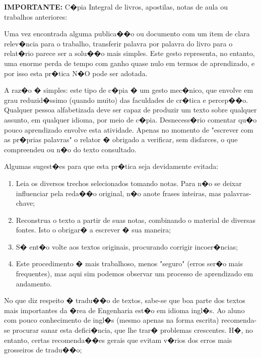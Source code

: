 \documentclass[conference]{IEEEtran}
\begin{document}
\textbf{IMPORTANTE: }C�pia Integral de livros, apostilas, notas de aula ou trabalhos anteriores:

Uma vez encontrada alguma publica��o ou documento com um item de clara relev�ncia para o trabalho, transferir palavra por palavra do livro para o relat�rio parece ser a solu��o mais simples. Este gesto representa, no entanto, uma enorme perda de tempo com ganho quase nulo em termos de aprendizado, e por isso esta pr�tica N�O pode ser adotada.

A raz�o � simples: este tipo de c�pia � um gesto mec�nico, que envolve em grau reduzid�ssimo (quando muito) das faculdades de cr�tica e percep��o. Qualquer pessoa alfabetizada deve ser capaz de produzir um texto sobre qualquer assunto, em qualquer idioma, por meio de c�pia. Desnecess�rio comentar qu�o pouco aprendizado envolve esta atividade. Apenas no momento de "escrever com as pr�prias palavras" o relator � obrigado a verificar, sem disfarces, o que compreendeu ou n�o do texto consultado.

Algumas sugest�es para que esta pr�tica seja devidamente evitada:
\begin{enumerate}
\item Leia os diversos trechos selecionados tomando notas. Para n�o se deixar influenciar pela reda��o original, n�o anote frases inteiras, mas palavras-chave;
\item Reconstrua o texto a partir de suas notas, combinando o material de diversas fontes. Isto o obrigar� a escrever � sua maneira;
\item S� ent�o volte aos textos originais, procurando corrigir incoer�ncias;
\item Este procedimento � mais trabalhoso, menos "seguro" (erros ser�o mais frequentes), mas aqui sim podemos observar um processo de aprendizado em andamento.
\end{enumerate}

No que diz respeito � tradu��o de textos, sabe-se que boa parte dos textos mais importantes da �rea de Engenharia est�o em idioma ingl�s. Ao aluno com pouco conhecimento de ingl�s (mesmo apenas na forma escrita) recomenda-se procurar sanar esta defici�ncia, que lhe trar� problemas crescentes. H�, no entanto, certas recomenda��es gerais que evitam v�rios dos erros mais grosseiros de tradu��o;
\end{document}
